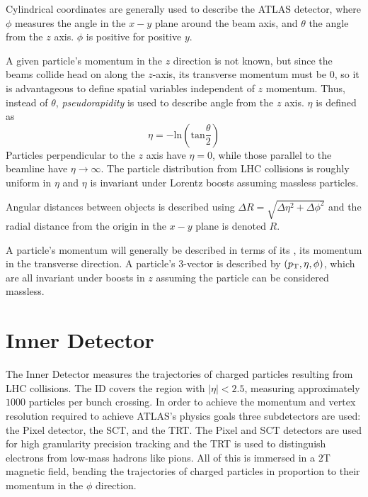 Cylindrical coordinates are generally used to describe the \ac{ATLAS} detector, where $\phi$ measures the angle in the $x-y$ plane around the beam axis, and $\theta$ the angle from the $z$ axis. $\phi$ is positive for positive $y$. 

A given particle's momentum in the $z$ direction is not known, but since the beams collide head on along the $z$-axis, its transverse momentum must be $0$, so it is advantageous to define spatial variables independent of $z$ momentum. Thus, instead of $\theta$, \emph{pseudorapidity} is used to describe angle from the $z$ axis. $\eta$ is defined as
\begin{equation}
\eta = - \textrm{ln}(\textrm{tan}\frac{\theta}{2}) 
\end{equation}
Particles perpendicular to the $z$ axis have $\eta = 0$, while those parallel to the beamline have $\eta \rightarrow \infty$. The particle distribution from \ac{LHC} collisions is roughly uniform in $\eta$ and $\eta$ is invariant under Lorentz boosts assuming massless particles.

Angular distances between objects is described using $\Delta R = \sqrt{\Delta \eta ^2 + \Delta \phi ^2}$ and the radial distance from the origin in the $x-y$ plane is denoted $R$. 

A particle's momentum will generally be described in terms of its \pT, its momentum in the transverse direction. A particle's $3$-vector is described by $(p_{\text{T}}, \eta, \phi)$, which are all invariant under boosts in $z$ assuming the particle can be considered massless.


\section{Inner Detector}
The Inner Detector measures the trajectories of charged particles resulting from \ac{LHC} collisions. The \ac{ID} covers the region with $|\eta| < 2.5$, measuring approximately $1000$ particles per bunch crossing. In order to achieve the momentum and vertex resolution required to achieve \ac{ATLAS}'s physics goals three subdetectors are used: the Pixel detector, the \ac{SCT}, and the \ac{TRT}. The Pixel and \ac{SCT} detectors are used for high granularity precision tracking and the \ac{TRT} is used to distinguish electrons from low-mass hadrons like pions. All of this is immersed in a $2$T magnetic field, bending the trajectories of charged particles in proportion to their momentum in the $\phi$ direction.

